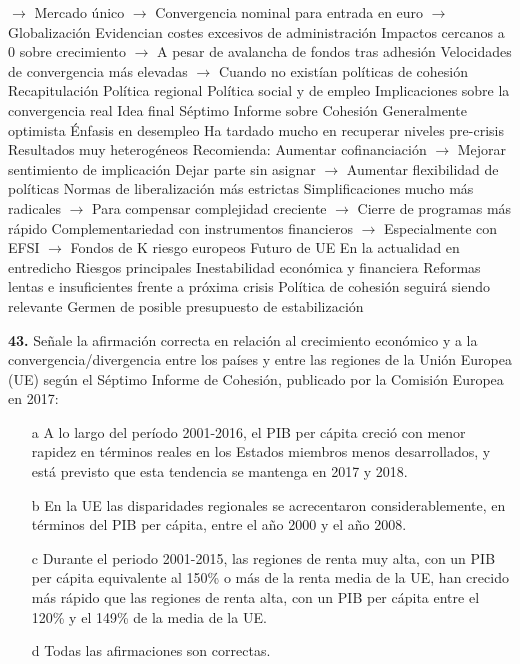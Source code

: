 \documentclass{nuevotema}
\begin{document}
\begin{esquemal}
				\4[] $\to$ Mercado único
				\4[] $\to$ Convergencia nominal para entrada en euro
				\4[] $\to$ Globalización
				\4[] Evidencian costes excesivos de administración
				\4[] Impactos cercanos a 0 sobre crecimiento
				\4[] $\to$ A pesar de avalancha de fondos tras adhesión
				\4[] Velocidades de convergencia más elevadas
				\4[] $\to$ Cuando no existían políticas de cohesión
	\1[] 
		\2 Recapitulación
			\3 Política regional
			\3 Política social y de empleo
			\3 Implicaciones sobre la convergencia real
		\2 Idea final
			\3 Séptimo Informe sobre Cohesión
				\4 Generalmente optimista
				\4 Énfasis en desempleo
				\4[] Ha tardado mucho en recuperar niveles pre-crisis
				\4[] Resultados muy heterogéneos
				\4 Recomienda:
				\4[] Aumentar cofinanciación
				\4[] $\to$ Mejorar sentimiento de implicación
				\4[] Dejar parte sin asignar
				\4[] $\to$ Aumentar flexibilidad de políticas
				\4[] Normas de liberalización más estrictas
				\4[] Simplificaciones mucho más radicales
				\4[] $\to$ Para compensar complejidad creciente
				\4[] $\to$ Cierre de programas más rápido
				\4[] Complementariedad con instrumentos financieros
				\4[] $\to$ Especialmente con EFSI
				\4[] $\to$ Fondos de K riesgo europeos
			\3 Futuro de UE
				\4 En la actualidad en entredicho
				\4 Riesgos principales
				\4[] Inestabilidad económica y financiera
				\4[] Reformas lentas e insuficientes frente a próxima crisis
				\4 Política de cohesión seguirá siendo relevante
				\4[] Germen de posible presupuesto de estabilización
\end{esquemal}

\preguntas


\textbf{43.} Señale la afirmación correcta en relación al crecimiento económico y a la convergencia/divergencia entre los países y entre las regiones de la Unión Europea (UE) según el Séptimo Informe de Cohesión, publicado por la Comisión Europea en 2017:

\begin{itemize}
	\item[a] A lo largo del período 2001-2016, el PIB per cápita creció con menor rapidez en términos reales en los Estados miembros menos desarrollados, y está previsto que esta tendencia se mantenga en 2017 y 2018.
	\item[b] En la UE las disparidades regionales se acrecentaron considerablemente, en términos del PIB per cápita, entre el año 2000 y el año 2008.
	\item[c] Durante el periodo 2001-2015, las regiones de renta muy alta, con un PIB per cápita equivalente al 150\% o más de la renta media de la UE, han crecido más rápido que las regiones de renta alta, con un PIB per cápita entre el 120\% y el 149\% de la media de la UE.
	\item[d] Todas las afirmaciones son correctas.
\end{itemize}
\end{document}

